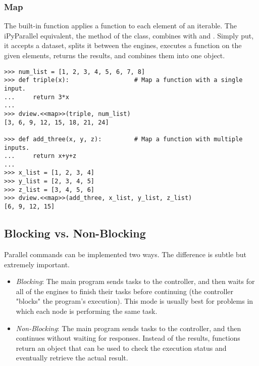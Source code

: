 \subsubsection*{Map} %

The built-in  function applies a function to each element of an iterable.
The iPyParallel equivalent, the  method of the  class, combines  with  and .
Simply put, it accepts a dataset, splits it between the engines, executes a function on the given elements, returns the results, and combines them into one object.

\begin{lstlisting}
>>> num_list = [1, 2, 3, 4, 5, 6, 7, 8]
>>> def triple(x):                  # Map a function with a single input.
...     return 3*x
...
>>> dview.<<map>>(triple, num_list)
[3, 6, 9, 12, 15, 18, 21, 24]

>>> def add_three(x, y, z):         # Map a function with multiple inputs.
...     return x+y+z
...
>>> x_list = [1, 2, 3, 4]
>>> y_list = [2, 3, 4, 5]
>>> z_list = [3, 4, 5, 6]
>>> dview.<<map>>(add_three, x_list, y_list, z_list)
[6, 9, 12, 15]
\end{lstlisting}


\subsection*{Blocking vs. Non-Blocking} %

Parallel commands can be implemented two ways.
The difference is subtle but extremely important.

\begin{itemize}
\item \emph{Blocking}: %
The main program sends tasks to the controller, and then waits for all of the engines to finish their tasks before continuing (the controller "blocks" the program's execution).
This mode is usually best for problems in which each node is performing the same task.
\item \emph{Non-Blocking}:
The main program sends tasks to the controller, and then continues without waiting for responses.
Instead of the results, functions return an  object that can be used to check the execution status and eventually retrieve the actual result.
\end{itemize}

